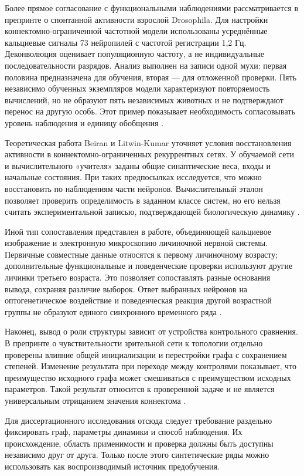 Более прямое согласование с функциональными наблюдениями рассматривается в препринте о спонтанной активности взрослой Drosophila. Для настройки коннектомно-ограниченной частотной модели использованы усреднённые кальциевые сигналы 73 нейропилей с частотой регистрации 1,2 Гц. Деконволюция оценивает популяционную частоту, а не индивидуальные последовательности разрядов. Анализ выполнен на записи одной мухи: первая половина предназначена для обучения, вторая --- для отложенной проверки. Пять независимо обученных экземпляров модели характеризуют повторяемость вычислений, но не образуют пять независимых животных и не подтверждают перенос на другую особь. Этот пример показывает необходимость согласовывать уровень наблюдения и единицу обобщения \cite{s739}.

Теоретическая работа Beiran и Litwin-Kumar уточняет условия восстановления активности в коннектомно-ограниченных рекуррентных сетях. У обучаемой сети и вычислительного «учителя» заданы общие синаптические веса, входы и начальные состояния. При таких предпосылках исследуется, что можно восстановить по наблюдениям части нейронов. Вычислительный эталон позволяет проверить определимость в заданном классе систем, но его нельзя считать экспериментальной записью, подтверждающей биологическую динамику \cite{s743}.

Иной тип сопоставления представлен в работе, объединяющей кальциевое изображение и электронную микроскопию личиночной нервной системы. Первичные совместные данные относятся к первому личиночному возрасту; дополнительные функциональные и поведенческие проверки используют другие личинки третьего возраста. Это позволяет сопоставлять разные основания вывода, сохраняя различие выборок. Ответ выбранных нейронов на оптогенетическое воздействие и поведенческая реакция другой возрастной группы не образуют единого синхронного временного ряда \cite{s212}.

Наконец, вывод о роли структуры зависит от устройства контрольного сравнения. В препринте о чувствительности зрительной сети к топологии отдельно проверены влияние общей инициализации и перестройки графа с сохранением степеней. Изменение результата при переходе между контролями показывает, что преимущество исходного графа может смешиваться с преимуществом исходных параметров. Такой результат относится к проверенной задаче и не является универсальным отрицанием значения коннектома \cite{s741}.

Для диссертационного исследования отсюда следует требование раздельно фиксировать граф, параметры динамики и способ наблюдения. Их происхождение, область применимости и проверка должны быть доступны независимо друг от друга. Только после этого синтетические ряды можно использовать как воспроизводимый источник предобучения.

